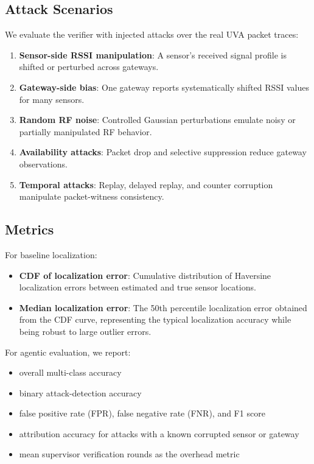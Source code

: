 \documentclass[10pt, twocolumn, letterpaper]{article}
\begin{document}
\subsection{Attack Scenarios}

We evaluate the verifier with injected attacks over the real UVA packet traces:
\begin{enumerate}
    \item \textbf{Sensor-side RSSI manipulation}: A sensor's received signal profile is shifted or perturbed across gateways.
    \item \textbf{Gateway-side bias}: One gateway reports systematically shifted RSSI values for many sensors.
    \item \textbf{Random RF noise}: Controlled Gaussian perturbations emulate noisy or partially manipulated RF behavior.
    \item \textbf{Availability attacks}: Packet drop and selective suppression reduce gateway observations.
    \item \textbf{Temporal attacks}: Replay, delayed replay, and counter corruption manipulate packet-witness consistency.
\end{enumerate}

\subsection{Metrics}

For baseline localization:

\begin{itemize}
    \item \textbf{CDF of localization error}: Cumulative distribution of Haversine localization errors between estimated and true sensor locations.
    \item \textbf{Median localization error}: The 50th percentile localization error obtained from the CDF curve, representing the typical localization accuracy while being robust to large outlier errors.
\end{itemize}

For agentic evaluation, we report:
\begin{itemize}
    \item overall multi-class accuracy
    \item binary attack-detection accuracy
    \item false positive rate (FPR), false negative rate (FNR), and F1 score
    \item attribution accuracy for attacks with a known corrupted sensor or gateway
    \item mean supervisor verification rounds as the overhead metric
\end{itemize}
\end{document}
